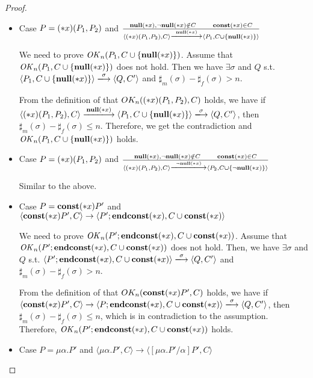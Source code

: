 \begin{proof}
\begin{itemize}
 \item Case \( P = (*x)(P_1,P_2) \) and \( \frac{ \snull,\snnull \notin C
  \andalso \scon\Sirx \in C} { \langle \Sirx(P_1, P_2), C \rangle
  \xlongrightarrow{\snull} \langle P_1, C\cup\{\snull\} \rangle } \)

  We need to prove \(\mathit{OK}_n(P_1, C\cup\{{\bf null}(*x)\})\).  Assume that
  \(\mathit{OK}_n(P_1, C\cup\{{\bf null}(*x)\})\) does not hold. Then we have \(
  \exists \sigma \) and \(Q\) s.t. \( \langle P_1, C\cup\{\snull\}
  \rangle \xlongrightarrow{\sigma} \langle Q, C' \rangle \) and
  \(\sharp_{m}(\sigma) - \sharp_{f}(\sigma) > n\).

  From the definition of that \(OK_n((*x)(P_1, P_2), C)\) holds, we
  have if \( \langle \Sirx(P_1, P_2), C \rangle \xlongrightarrow{\snull}
  \langle P_1, C\cup\{\snull\} \rangle \xlongrightarrow{\sigma}
  \langle Q, C' \rangle \), then \(\sharp_m(\sigma) - \sharp_f(\sigma)
  \le n \). Therefore, we
  get the contradiction and \(\mathit{OK}_n(P_1, C\cup\{{\bf null}(*x)\})\) holds.

\item Case \( P = (*x)(P_1,P_2) \) and \( \frac{ \snull,\snnull \notin C
  \andalso \scon\Sirx \in C} { \langle \Sirx(P_1, P_2), C \rangle
  \xlongrightarrow{\snnull} \langle P_2, C\cup\{\snnull\} \rangle } \)

  Similar to the above.
  
\item Case \( P = \mathbf{const}(*x) P' \) and \( \langle \mathbf{const}(*x) P', C \rangle
  \rightarrow \langle P';\mathbf{endconst}(*x), C\cup{\mathbf{const}(*x)} \rangle  \)

  We need to prove \(\mathit{OK}_n(P';\mathbf{endconst}(*x), C\cup{\mathbf{const}(*x)})\).  Assume
  that \(\mathit{OK}_n(P';\mathbf{endconst}(*x), C\cup{\mathbf{const}(*x)})\) does not hold. Then,
  we have \( \exists \sigma \) and \(Q\) s.t. \( \langle
  P';\Endconst, C\cup{\scon\Sirx} \rangle \xlongrightarrow{\sigma}
  \langle Q, C' \rangle \) and \(\sharp_{m}(\sigma) -
  \sharp_{f}(\sigma) > n\).

  From the definition of that \(OK_n(\mathbf{const}(*x) P', C)\) holds, we
  have if \( \langle \scon\Sirx P', C \rangle \rightarrow \langle
  P;\Endconst, C\cup{\scon\Sirx} \rangle \xlongrightarrow{\sigma}
  \langle Q, C' \rangle \), then \(\sharp_m(\sigma) -
  \sharp_f(\sigma) \le n \), which is in
  contradiction to the assumption.  Therefore, \(\mathit{OK}_n(P';\mathbf{endconst}(*x), C\cup{\mathbf{const}(*x)})\)
  holds.

\item Case \( P = \mu\alpha.P' \) and \( \langle \mu\alpha.P', C
  \rangle \rightarrow \langle [\mu\alpha.P'/\alpha]P', C \rangle \)


\end{itemize}
\end{proof}
